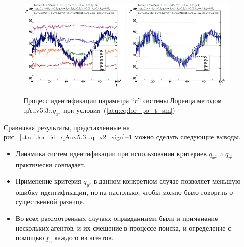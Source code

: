 \begin{figure}[h!]
  \centerline{
    \includegraphics[width=0.49\textwidth]{p/cha/lor/qAuv5.3r/lor_qAuv5_3r_qy2-p_t_pi_sin.png}
    \hfill
    \includegraphics[width=0.49\textwidth]{p/cha/lor/qAuv5.3r/lor_qAuv5_3r_qy2-p_t_pz_sin.png}
  }
  \caption{Процесс идентификации параметра ``$r$'' системы Лоренца методом qAuv5.3r.$q_{x^2}$ при условии~(\ref{atu:eq:lor_po_t_sin})}
  \label{atu:f:lor_id_qAuv5.3r.q_y2_sin}
\end{figure}

Сравнивая результаты, представленные на рис.~\ref{atu:f:lor_id_qAuv5.3r.q_x2_sign}--\ref{atu:f:lor_id_qAuv5.3r.q_y2_sin}
можно сделать следующие выводы:

\begin{itemize}

  \item
    Динамика систем идентификации при использовании критериев $q_{x^2}$ и $q_{y^2}$
    практически совпадает.

  \item
    Применение критерия  $q_{y^2}$ в данном конкретном случае позволяет
    меньшую ошибку идентификации, но на настолько,
    чтобы можно было говорить о существенной разнице.

  \item
    Во всех рассмотренных случаях оправданными были и применение нескольких агентов,
    и их смещение в процессе поиска, и определение с помощью $p_e$
    каждого из агентов.

\end{itemize}

